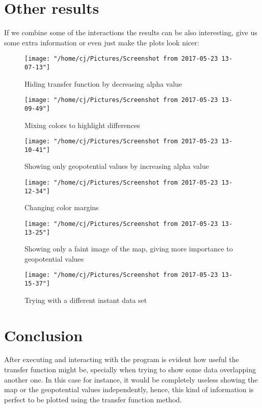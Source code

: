 \documentclass{article}
\begin{document}
\section{Other results}
If we combine some of the interactions the results can be also interesting, give us some extra information or even just make the plots look nicer:

\begin{figure}[H]
  \centering
  \texttt{[image: "/home/cj/Pictures/Screenshot from 2017-05-23 13-07-13"]}
  \caption{Hiding transfer function by decreasing alpha value}
\end{figure}

\begin{figure}[H]
  \centering
  \texttt{[image: "/home/cj/Pictures/Screenshot from 2017-05-23 13-09-49"]}
  \caption{Mixing colors to highlight differences}
\end{figure}

\begin{figure}[H]
  \centering
  \texttt{[image: "/home/cj/Pictures/Screenshot from 2017-05-23 13-10-41"]}
  \caption{Showing only geopotential values by increasing alpha value}
\end{figure}

\begin{figure}[H]
  \centering
  \texttt{[image: "/home/cj/Pictures/Screenshot from 2017-05-23 13-12-34"]}
  \caption{Changing color margins}
\end{figure}

\begin{figure}[H]
  \centering
  \texttt{[image: "/home/cj/Pictures/Screenshot from 2017-05-23 13-13-25"]}
  \caption{Showing only a faint image of the map, giving more importance to geopotential values}
\end{figure}

\begin{figure}[H]
  \centering
  \texttt{[image: "/home/cj/Pictures/Screenshot from 2017-05-23 13-15-37"]}
  \caption{Trying with a different instant data set}
\end{figure}

\section{Conclusion}
After executing and interacting with the program is evident how useful the transfer function might be, specially when trying to show some data overlapping another one. In this case for instance, it would be completely useless showing the map or the geopotential values independently, hence, this kind of information is perfect to be plotted using the transfer function method.
\end{document}
